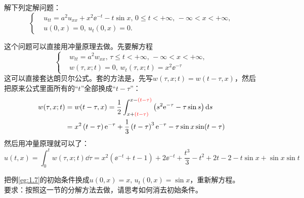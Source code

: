 \begin{problembox}
    \begin{example}\label{eg:1.7}
        解下列定解问题：
        \begin{equation*}
            \left\{
                \begin{aligned}
                    &u_{tt} = a^2 u_{xx} + x^2 \ee^{-t} - t \sin x,\, 0 \leq t < +\infty,\, -\infty< x < +\infty,\\
                    &u(0, x) = 0,\, u_t(0, x) = 0.
                \end{aligned}
            \right.
        \end{equation*}
    \end{example}
    \begin{solution}
        这个问题可以直接用冲量原理去做。先要解方程
        \begin{equation*}
            \left\{
                \begin{aligned}
                    &w_{tt} = a^2 w_{xx},\, \tau \leq t < +\infty,\, -\infty< x < +\infty,\\
                    &w(\tau, x; t) = 0,\, w_t(\tau, x; t) = x^2 \ee^{-\tau}
                \end{aligned}
            \right.
        \end{equation*}
        这可以直接套达朗贝尔公式。套的方法是，先写$w(\tau, x; t) = w(t - \tau, x)$，然后把原来公式里面所有的“$t$”全部换成“$t - \tau$”：
        \begin{align*}
            w(\tau, x; t) &= w(t - \tau, x) = \frac{1}{2}\int_{x + {\color{red}\left(t - \tau\right)}}^{x - {\color{red}\left(t - \tau\right)}} \left(s^2 \mathrm{e}^{-\tau} - \tau \sin s\right) \dd{s}\\
            &= x^2 \left(t - \tau\right) \mathrm{e}^{-\tau} + \frac{1}{3}\left(t - \tau\right)^3 \mathrm{e}^{-\tau} - \tau \sin x \sin(t - \tau)
        \end{align*}
        然后用冲量原理就可以了：
        \[u(t, x) = \int_{0}^{t} w(\tau, x; t) \dd{\tau} = x^2\left(\ee^{-t} + t - 1\right) + 2 \ee^{-t} + \frac{t^3}{3} - t^2 + 2t - 2 - t \sin x + \sin x \sin t\]
    \end{solution}
\end{problembox}
\begin{problembox}
    \begin{exercise}
        把例\ref{eg:1.7}的初始条件换成$u(0, x) = x,\, u_t(0, x) = \sin x$，重新解方程。
        \\要求：按照这一节的分解方法去做，请思考如何消去初始条件。
    \end{exercise}
\end{problembox}

